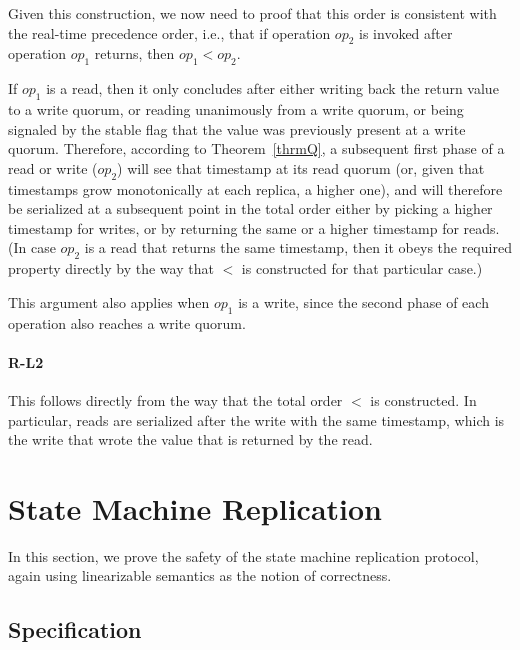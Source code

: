 Given this construction, we now need to proof that this order is
consistent with the real-time precedence order, i.e., that if
operation $op_2$ is invoked after operation $op_1$ returns, then
$op_1 < op_2$.

If $op_1$ is a read, then it only concludes after either writing
back the return value to a write quorum, or reading unanimously
from a write quorum, or being signaled by the stable flag that
the value was previously present at a write quorum. Therefore,
according to Theorem~\ref{thrmQ},  a
subsequent first phase of a read or write
($op_2$) will see that timestamp at its read
quorum (or, given that timestamps grow monotonically at each replica, a higher one), and will therefore be serialized at a subsequent point in
the total order either by picking a higher timestamp for writes, or by returning the same or a higher timestamp
for reads. (In case $op_2$ is a read that returns the same timestamp,
then it obeys the required property directly by the way that $<$ is
constructed for that particular case.)

This argument also applies when $op_1$ is a write, since the second phase of each operation
also reaches a write quorum.

\paragraph{R-L2}
This follows directly from the way that the total order $<$ is
constructed. In particular, reads are serialized after the write
with the same timestamp, which is the write
that wrote the value that is returned by the
read.

\section{State Machine Replication}\label{app:smr}

In this section, we prove the safety of the state machine
replication protocol, again using linearizable semantics as the
notion of correctness.

\subsection{Specification}

